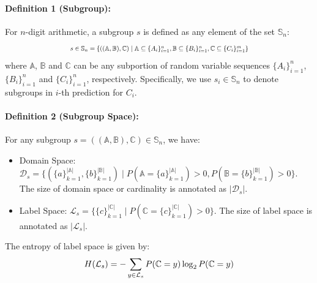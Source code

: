 \documentclass[11pt]{article}
\begin{document}
\paragraph{Definition 1 (Subgroup):}
For \( n \)-digit arithmetic, a subgroup $s$ is defined as any element of the set \( \mathbb{S}_n \):
\[
\scalebox{0.75}{$
s \in \mathbb{S}_n = \{((\mathbb{A}, \mathbb{B}), \mathbb{C}) \mid \mathbb{A} \subseteq \{A_i\}_{i=1}^n, \mathbb{B} \subseteq \{B_i\}_{i=1}^n, \mathbb{C} \subseteq \{C_i\}_{i=1}^{m}\}
$}
\]
where \( \mathbb{A} \), \( \mathbb{B} \) and \( \mathbb{C} \) can be any subportion of random variable sequences \(\{A_i\}_{i=1}^n\), \( \{B_i\}_{i=1}^n \) and \(\{C_i\}_{i=1}^n\), respectively. Specifically, we use $s_i \in \mathbb{S}_n$ to denote subgroups in $i$-th prediction for $C_i$.

\paragraph{Definition 2 (Subgroup Space):}
For any subgroup $s = ((\mathbb{A}, \mathbb{B}), \mathbb{C}) \in \mathbb{S}_n$, we have:
\vspace{-0.2cm}
\begin{itemize}
    \item Domain Space: $\mathcal{D}_s = \{(\{a\}_{k=1}^{|\mathbb{A}|}, \{b\}_{k=1}^{|\mathbb{B}|}) \mid P(\mathbb{A}=\{a\}_{k=1}^{|\mathbb{A}|})>0,P(\mathbb{B}=\{b\}_{k=1}^{|\mathbb{B}|})>0\}$. The size of domain space or cardinality
 is annotated as $|\mathcal{D}_s|$.
 \vspace{-0.4cm}
    \item Label Space: $\mathcal{L}_s = \{\{c\}_{k=1}^{|\mathbb{C}|} \mid P(\mathbb{C}=\{c\}_{k=1}^{|\mathbb{C}|})>0\}$.  The size of label space is annotated as $|\mathcal{L}_s|$.
\vspace{-0.2cm}
\end{itemize}
The entropy of label space is given by:
\[
H(\mathcal{L}_s) = -\sum_{y \in \mathcal{L}_s}P(\mathbb{C}=y)  \log_2 P(\mathbb{C}=y)
\vspace{-0.2cm}
\]
\end{document}

